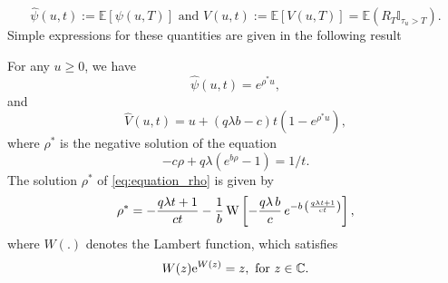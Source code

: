 \begin{equation}\label{eq:value_function_exp_time_horizon}
\widehat{\psi}(u,t):= \mathbb{E}[\psi(u,T)] \text{ and }\widehat{V}(u,t):= \mathbb{E}[V(u,T)] = \mathbb{E}(R_T\mathbb{I}_{\tau_u>T}).
\end{equation} 
Simple expressions for these quantities are given in the following result 
\begin{theo}\label{theo:psi_V_T_solo_mining}
For any $u\geq0$, we have
\begin{equation*}
\widehat{\psi}(u,t) = e^{\rho^\ast u},
\end{equation*}
and 
\begin{equation*}
\widehat{V}(u,t) = u+(q\lambda b-c)t\left(1-e^{\rho^\ast u }\right),
\end{equation*}
where $\rho^\ast$ is the negative solution of the equation
\begin{equation}\label{eq:equation_rho}
-c\rho + q\lambda(e^{b\rho}-1) = 1/t.
\end{equation}
The solution $\rho^\ast$ of \eqref{eq:equation_rho} is given by 
\begin{equation*}
  \rho^{\ast}=-\frac{q\lambda t+1}{ct}
  -\frac{1}{b} \,{\rm W} \left[-\frac{q\lambda
    \,b}{c}\,{e^{-b\,\left(\frac{q\lambda t+1}{ct}\right)}}
  \right],
  \end{equation*}
  where $W(.)$ denotes the Lambert function, which satisfies
  $$
  W(z)\mathrm{e}^{W(z)} = z,\text{ for }z\in\mathbb{C}.
  $$
\end{theo}
